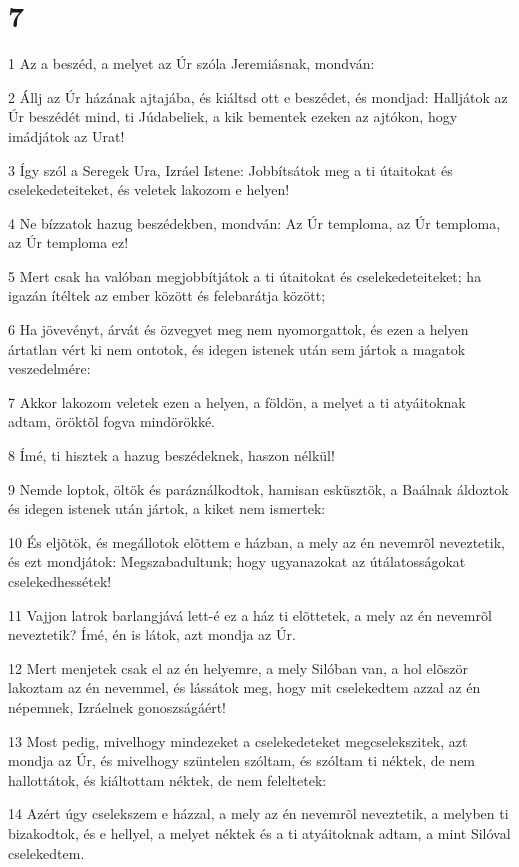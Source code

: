 \chapter{7}

\par 1 Az a beszéd, a melyet az Úr szóla Jeremiásnak, mondván:
\par 2 Állj az Úr házának ajtajába, és kiáltsd ott e beszédet, és mondjad: Halljátok az Úr beszédét mind, ti Júdabeliek, a kik bementek ezeken az ajtókon, hogy imádjátok az Urat!
\par 3 Így szól a Seregek Ura, Izráel Istene: Jobbítsátok meg a ti útaitokat és cselekedeteiteket, és veletek lakozom e helyen!
\par 4 Ne bízzatok hazug beszédekben, mondván: Az Úr temploma, az Úr temploma, az Úr temploma ez!
\par 5 Mert csak ha valóban megjobbítjátok a ti útaitokat és cselekedeteiteket; ha igazán ítéltek az ember között és felebarátja között;
\par 6 Ha jövevényt, árvát és özvegyet meg nem nyomorgattok, és ezen a helyen ártatlan vért ki nem ontotok, és idegen istenek után sem jártok a magatok veszedelmére:
\par 7 Akkor lakozom veletek ezen a helyen, a földön, a melyet a ti atyáitoknak adtam, öröktõl fogva mindörökké.
\par 8 Ímé, ti hisztek a hazug beszédeknek, haszon nélkül!
\par 9 Nemde loptok, öltök és paráználkodtok, hamisan esküsztök, a Baálnak áldoztok és idegen istenek után jártok, a kiket nem ismertek:
\par 10 És eljõtök, és megállotok elõttem e házban, a mely az én nevemrõl neveztetik, és ezt mondjátok: Megszabadultunk; hogy ugyanazokat az útálatosságokat cselekedhessétek!
\par 11 Vajjon latrok barlangjává lett-é ez a ház ti elõttetek, a mely az én nevemrõl neveztetik? Ímé, én is látok, azt mondja az Úr.
\par 12 Mert menjetek csak el az én helyemre, a mely Silóban van, a hol elõször lakoztam az én nevemmel, és lássátok meg, hogy mit cselekedtem azzal az én népemnek, Izráelnek gonoszságáért!
\par 13 Most pedig, mivelhogy mindezeket a cselekedeteket megcselekszitek, azt mondja az Úr, és mivelhogy szüntelen szóltam, és szóltam ti néktek, de nem hallottátok, és kiáltottam néktek, de nem feleltetek:
\par 14 Azért úgy cselekszem e házzal, a mely az én nevemrõl neveztetik, a melyben ti bizakodtok, és e hellyel, a melyet néktek és a ti atyáitoknak adtam, a mint Silóval  cselekedtem.
